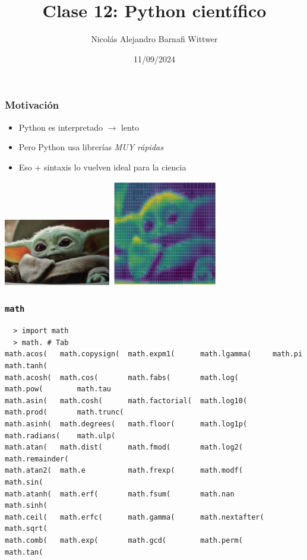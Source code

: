 \documentclass[14pt,aspectratio=169,xcolor=dvipsnames]{beamer}
\title[short title]{Clase 12: Python científico}
\subtitle{}
\author[NA Barnafi] {Nicolás Alejandro Barnafi Wittwer}
\institute[UC|CMM] 
{
    Pontificia Universidad Católica de Chile \\
    Centro de Modelamiento Matemático
}
\date{11/09/2024}
\begin{document}
\begin{frame}
    \maketitle
\end{frame}
\begin{frame}[fragile]\frametitle{Motivación}
    \begin{itemize}
        \item Python es interpretado $\to$ lento
        \item Pero Python usa librerías \emph{MUY rápidas}
        \item Eso + sintaxis lo vuelven ideal para la ciencia
    \end{itemize}
    \begin{center}
    \includegraphics[width=0.35\textwidth]{../images/baby-yoda-T.jpg} \hspace{1cm}\includegraphics[width=0.35\textwidth]{../images/baby-yoda-mesh.png}
    \end{center}
\end{frame}
\begin{frame}[fragile]\frametitle{\texttt{math}}
    \begin{verbatim}
  > import math
  > math. # Tab
math.acos(   math.copysign(  math.expm1(      math.lgamma(     math.pi          math.tanh(
math.acosh(  math.cos(       math.fabs(       math.log(        math.pow(        math.tau
math.asin(   math.cosh(      math.factorial(  math.log10(      math.prod(       math.trunc(
math.asinh(  math.degrees(   math.floor(      math.log1p(      math.radians(    math.ulp(
math.atan(   math.dist(      math.fmod(       math.log2(       math.remainder(  
math.atan2(  math.e          math.frexp(      math.modf(       math.sin(        
math.atanh(  math.erf(       math.fsum(       math.nan         math.sinh(       
math.ceil(   math.erfc(      math.gamma(      math.nextafter(  math.sqrt(       
math.comb(   math.exp(       math.gcd(        math.perm(       math.tan(  
    \end{verbatim}
    
\end{frame}
\end{document}
